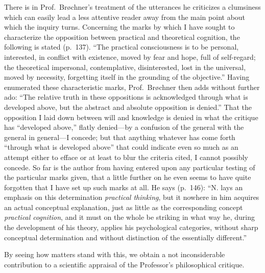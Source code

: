 \documentclass[12pt]{book}
\newcommand{\opage}[1]{\marginnote{\footnotesize\textit{[#1]}}}
\begin{document}
There is in Prof.\ Brøchner's treatment of the utterances he criticizes a
clumsiness which can easily lead a less attentive reader away from the
main point about which the inquiry turns. Concerning the marks by which I
have sought to characterize the opposition between practical and
theoretical cognition, the following is stated (p.\ 137). ``The practical
consciousness is to be personal, interested, in conflict with existence,
moved by fear and hope, full of
\opage{23}\setcounter{footnote}{0}%
self-regard; the theoretical impersonal, contemplative, disinterested,
lost in the universal, moved by necessity, forgetting itself in the
grounding of the objective.'' Having enumerated these characteristic
marks, Prof.\ Brøchner then adds without further ado: ``The relative
truth in these oppositions is acknowledged through what is developed
above, but the abstract and absolute opposition is denied.'' That the
opposition I laid down between will and knowledge is denied in what the
critique has ``developed above,'' flatly denied---by a confusion of the
general with the general in general---I concede; but that anything
whatever has come forth ``through what is developed above'' that could
indicate even so much as an attempt either to efface or at least to blur
the criteria cited, I cannot possibly concede. So far is the author from
having entered upon any particular testing of the particular marks given,
that a little further on he even seems to have quite forgotten that I
have set up such marks at all. He says (p.\ 146): ``N. lays an emphasis
on this determination \emph{practical thinking}, but it nowhere in him
acquires an actual conceptual explanation, just as little as the
corresponding concept \emph{practical cognition}, and it must on the
whole be striking in what way he, during the development of his theory,
applies his psychological categories, without sharp conceptual
determination and without distinction of the essentially different.''

By seeing how matters stand with this, we obtain a not inconsiderable
contribution to a scientific appraisal of the Professor's philosophical
critique.
\end{document}
